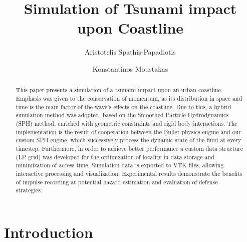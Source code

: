 \documentclass{llncs}
\begin{document}
\title{Simulation of Tsunami impact upon Coastline}


\author{Aristotelis Spathis-Papadiotis \and Konstantinos Moustakas}



\maketitle

\begin{abstract}
  This paper presents a simulation of a tsunami impact upon an urban coastline. Emphasis
  was given to the conservation of momentum, as its distribution in space and time is the
  main factor of the wave's effects on the coastline. Due to this, a hybrid simulation
  method was adopted, based on the Smoothed Particle Hydrodynamics (SPH) method, enriched
  with geometric constraints and rigid body interactions. The implementation is the result
  of cooperation between the Bullet physics engine and our custom SPH engine, which
  successively process the dynamic state of the fluid at every timestep. Furthermore, in
  order to achieve better performance a custom data structure (LP grid) was developed for
  the optimization of locality in data storage and minimization of access time. Simulation
  data is exported to VTK files, allowing interactive processing and
  visualization. Experimental results demonstrate the benefits of impulse recording at
  potential hazard estimation and evaluation of defense strategies. 
\end{abstract}

\section{Introduction}
\end{document}

